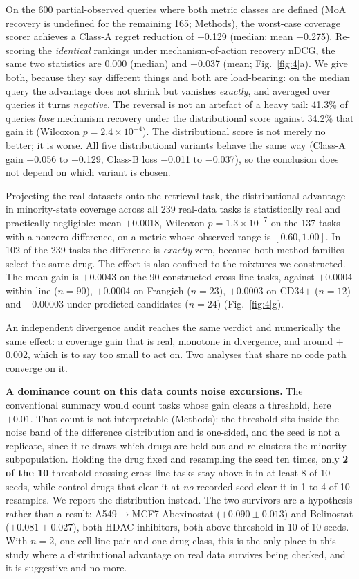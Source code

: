 \documentclass[11pt,letterpaper]{article}
\newcommand{\CONTROLRANGE}{1 to 4}
\begin{document}
On the 600 partial-observed queries where both metric classes are defined (MoA recovery is
undefined for the remaining 165; Methods), the worst-case coverage scorer achieves a Class-A
regret reduction of $+$0.129 (median; mean $+$0.275). Re-scoring the \emph{identical}
rankings under mechanism-of-action recovery nDCG, the same two statistics are 0.000
(median) and $-$0.037 (mean; Fig.~\ref{fig:4}a). We give both, because they say
different things and both are load-bearing: on the median query the advantage does not shrink
but vanishes \emph{exactly}, and averaged over queries it turns \emph{negative}. The reversal is
not an artefact of a heavy tail: 41.3\% of queries \emph{lose} mechanism recovery under the
distributional score against 34.2\% that gain it (Wilcoxon $p = 2.4\times10^{-4}$). The distributional score
is not merely no better; it is worse. All five distributional variants behave the same way (Class-A gain $+$0.056
to $+$0.129, Class-B loss $-$0.011 to $-$0.037), so the conclusion does not depend on which
variant is chosen.

Projecting the real datasets onto the retrieval task, the distributional advantage in
minority-state coverage across all 239 real-data tasks is statistically real and
practically negligible: mean $+$0.0018, Wilcoxon $p = 1.3\times10^{-7}$ on the
137 tasks with a nonzero difference, on a metric whose observed range is $[0.60, 1.00]$.
In 102 of the 239 tasks the difference is \emph{exactly} zero, because both method
families select the same drug. The effect is also confined to the mixtures we
constructed. The mean gain is $+$0.0043 on the 90 constructed cross-line tasks, against
$+$0.0004 within-line ($n = 90$), $+$0.0004 on Frangieh ($n = 23$), $+$0.0003 on CD34$+$
($n = 12$) and $+$0.00003 under predicted candidates ($n = 24$) (Fig.~\ref{fig:4}g).

An independent divergence audit reaches the same verdict and numerically the
same effect: a coverage gain that is real, monotone in divergence, and around $+$0.002,
which is to say too small to act on. Two analyses that share no code path converge on it.

\textbf{A dominance count on this data counts noise excursions.} The conventional summary would
count tasks whose gain clears a threshold, here $+0.01$. That count is not interpretable
(Methods): the threshold sits inside the noise band of the difference distribution and is
one-sided, and the seed is not a replicate, since it re-draws which drugs are held out and
re-clusters the minority subpopulation. Holding the drug fixed and resampling the seed ten times,
only \textbf{2 of the 10} threshold-crossing cross-line tasks stay above it in at least 8 of 10
seeds, while control drugs that clear it at \emph{no} recorded seed clear it in \CONTROLRANGE{} of
10 resamples. We report the distribution instead. The two survivors are a hypothesis rather than a
result: A549$\rightarrow$MCF7 Abexinostat ($+0.090 \pm 0.013$) and Belinostat
($+0.081 \pm 0.027$), both HDAC inhibitors, both above threshold in 10 of 10 seeds. With $n = 2$,
one cell-line pair and one drug class, this is the only place in this study where a distributional
advantage on real data survives being checked, and it is suggestive and no more.
\end{document}
